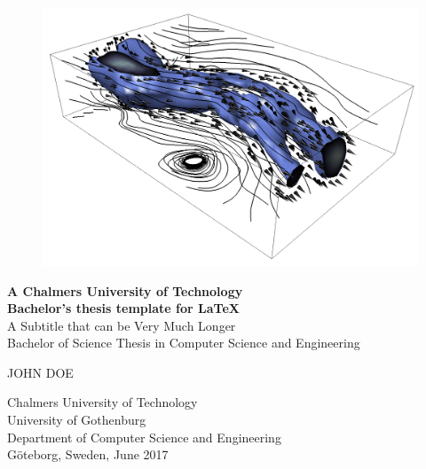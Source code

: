 
\begin{titlepage}
			
\addtolength{\voffset}{2cm}

\begin{figure}[H]
\centering
\vspace{2cm}	%
\includegraphics[width=0.9\linewidth]{figure/Wind.png}
\end{figure}

\mbox{}
\vfill
\renewcommand{\familydefault}{\sfdefault} \normalfont %
\textbf{{\Huge 	A Chalmers University of Technology 	\\[0.2cm] 
				Bachelor's thesis template for \LaTeX}} 	\\[0.5cm]
{\LARGE A Subtitle that can be Very Much Longer}\\[0.2cm]
Bachelor of Science Thesis in Computer Science and Engineering \setlength{\parskip}{0.5cm}

{\Large JOHN DOE} \setlength{\parskip}{1.9cm}

Chalmers University of Technology \\
University of Gothenburg \\
Department of Computer Science and Engineering \\
Göteborg, Sweden, June 2017


\end{titlepage}

